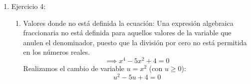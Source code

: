 \documentclass[11pt]{article}
\begin{document}
\begin{enumerate}
\begin{equation*}
\begin{cases}
            m + a = 160 \quad &\text{(1)} \\
            m + 6a = 460 \quad &\text{(2)}
        \end{cases}
    \end{equation*}
    Despejamos $m$ de la ecuación (1):
    \begin{equation*}
        m = 160 - a
    \end{equation*}
    Sustituimos la expresión de $m$ en la ecuación (2):
    \begin{align*}
        (160 - a) + 6a &= 460 \\
        160 + 5a &= 460 \\
        5a &= 460 - 160 \\
        5a &= 300 \\
        a &= \frac{300}{5} \\
        a &= 60
    \end{align*}
    Con el valor de $a = 60$, calculamos la cantidad de menores $m$:
    \begin{equation*}
        m = 160 - 60 = 100
    \end{equation*}
    Entonces podemos concluir que asistieron \textbf{100 menores de 10 años} y \textbf{60 adultos} al concierto.
    \item Ejercicio 4:
    \begin{enumerate}
        \item  Valores donde no está definida la ecuación:
        Una expresión algebraica fraccionaria no está definida para aquellos valores de la variable que anulen el denominador, puesto que la división por cero no está permitida en los números reales.
        \begin{equation*}
            \implies x^4 - 5x^2 + 4 = 0
        \end{equation*}
        Realizamos el cambio de variable $u = x^2$ (con $u \ge 0$):
        \begin{equation*}
            u^2 - 5u + 4 = 0
        \end{equation*}


\end{enumerate}
\end{enumerate}
\end{document}
